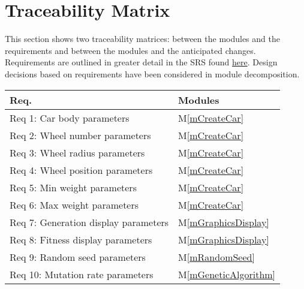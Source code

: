 \documentclass[12pt, titlepage]{article}
\newcommand{\mref}[1]{M\ref{#1}}
\begin{document}
\section{Traceability Matrix} \label{SecTM}

This section shows two traceability matrices: between the modules and the
requirements and between the modules and the anticipated changes. Requirements 
are outlined in greater detail in the SRS found 
\href{https://gitlab.cas.mcmaster.ca/linkk4/GrateBox/tree/master/Doc/SRS}{here}. 
Design decisions based on requirements have been considered in module 
decomposition.
\begin{table}[H]
\centering
\begin{tabular}{p{} p{}}
\toprule
\textbf{Req.} & \textbf{Modules}\\
\midrule
Req 1: Car body parameters & \mref{mCreateCar}\\
Req 2: Wheel number parameters & \mref{mCreateCar}\\
Req 3: Wheel radius parameters & \mref{mCreateCar}\\
Req 4: Wheel position parameters & \mref{mCreateCar}\\
Req 5: Min weight parameters & \mref{mCreateCar}\\
Req 6: Max weight parameters & \mref{mCreateCar}\\
Req 7: Generation display parameters &  \mref{mGraphicsDisplay}\\
Req 8: Fitness display parameters & \mref{mGraphicsDisplay}\\
Req 9: Random seed parameters & \mref{mRandomSeed}\\
Req 10: Mutation rate parameters & \mref{mGeneticAlgorithm}\\
\bottomrule
\end{tabular}
\label{TblRT}
\end{table}
\end{document}

